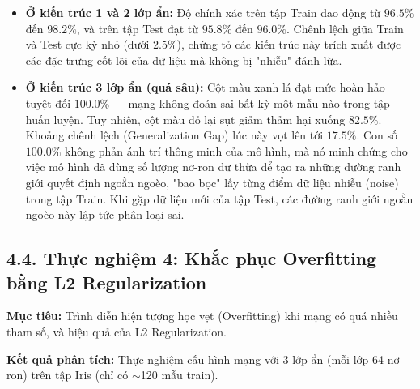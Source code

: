 \documentclass[13pt,a4paper]{article}
\begin{document}
\begin{itemize}
    \item \textbf{Ở kiến trúc 1 và 2 lớp ẩn:} Độ chính xác trên tập Train dao động từ $96.5\%$ đến $98.2\%$, và trên tập Test đạt từ $95.8\%$ đến $96.0\%$. Chênh lệch giữa Train và Test cực kỳ nhỏ (dưới $2.5\%$), chứng tỏ các kiến trúc này trích xuất được các đặc trưng cốt lõi của dữ liệu mà không bị "nhiễu" đánh lừa.
    \item \textbf{Ở kiến trúc 3 lớp ẩn (quá sâu):} Cột màu xanh lá đạt mức hoàn hảo tuyệt đối $100.0\%$ — mạng không đoán sai bất kỳ một mẫu nào trong tập huấn luyện. Tuy nhiên, cột màu đỏ lại sụt giảm thảm hại xuống $82.5\%$. Khoảng chênh lệch (Generalization Gap) lúc này vọt lên tới $17.5\%$. Con số $100.0\%$ không phản ánh trí thông minh của mô hình, mà nó minh chứng cho việc mô hình đã dùng số lượng nơ-ron dư thừa để tạo ra những đường ranh giới quyết định ngoằn ngoèo, "bao bọc" lấy từng điểm dữ liệu nhiễu (noise) trong tập Train. Khi gặp dữ liệu mới của tập Test, các đường ranh giới ngoằn ngoèo này lập tức phân loại sai.
\end{itemize}
\subsection*{4.4. Thực nghiệm 4: Khắc phục Overfitting bằng L2 Regularization}
\textbf{Mục tiêu:} Trình diễn hiện tượng học vẹt (Overfitting) khi mạng có quá nhiều tham số, và hiệu quả của L2 Regularization.

\textbf{Kết quả phân tích:} Thực nghiệm cấu hình mạng với 3 lớp ẩn (mỗi lớp 64 nơ-ron) trên tập Iris (chỉ có $\sim$120 mẫu train).
\end{document}
